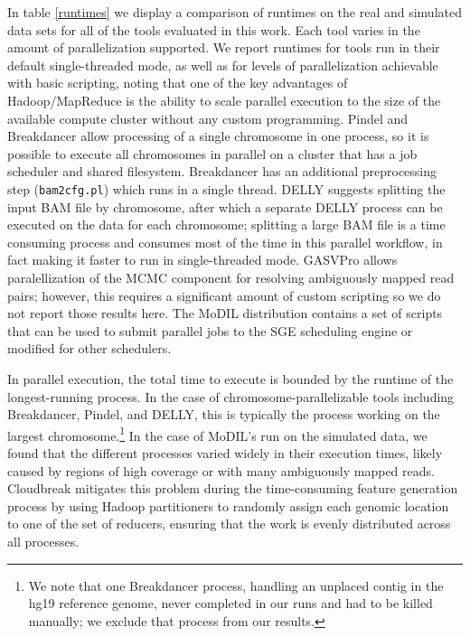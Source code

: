 \documentclass[11pt]{article}
\begin{document}
In table \ref{runtimes} we display a comparison of runtimes on the real and simulated data sets for all of the tools evaluated in this work. Each tool varies in the amount of parallelization supported. We report runtimes for tools run in their default single-threaded mode, as well as for levels of parallelization achievable with basic scripting, noting that one of the key advantages of Hadoop/MapReduce is the ability to scale parallel execution to the size of the available compute cluster without any custom programming. Pindel and Breakdancer allow processing of a single chromosome in one process, so it is possible to execute all chromosomes in parallel on a cluster that has a job scheduler and shared filesystem. Breakdancer has an additional preprocessing step (\verb|bam2cfg.pl|) which runs in a single thread. DELLY suggests splitting the input BAM file by chromosome, after which a separate DELLY process can be executed on the data for each chromosome; splitting a large BAM file is a time consuming process and consumes most of the time in this parallel workflow, in fact making it faster to run in single-threaded mode. GASVPro allows paralellization of the MCMC component for resolving ambiguously mapped read pairs; however, this requires a significant amount of custom scripting so we do not report those results here. The MoDIL distribution contains a set of scripts that can be used to submit parallel jobs to the SGE scheduling engine or modified for other schedulers.

In parallel execution, the total time to execute is bounded by the runtime of the longest-running process. In the case of chromosome-parallelizable tools including Breakdancer, Pindel, and DELLY, this is typically the process working on the largest chromosome.\footnote{We note that one Breakdancer process, handling an unplaced contig in the hg19 reference genome, never completed in our runs and had to be killed manually; we exclude that process from our results.} In the case of MoDIL's run on the simulated data, we found that the different processes varied widely in their execution times, likely caused by regions of high coverage or with many ambiguously mapped reads. Cloudbreak mitigates this problem during the time-consuming feature generation process by using Hadoop partitioners to randomly assign each genomic location to one of the set of reducers, ensuring that the work is evenly distributed across all processes.
\end{document}
